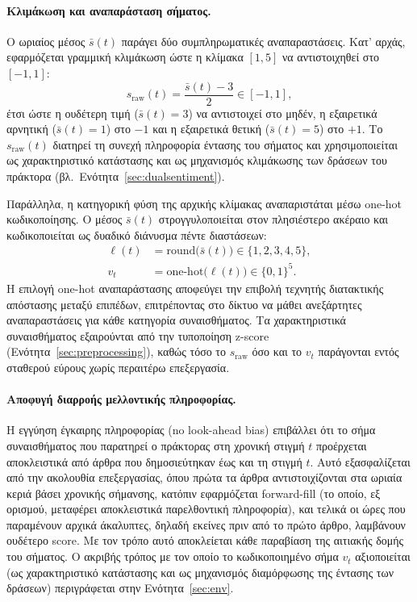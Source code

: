 \paragraph{Κλιμάκωση και αναπαράσταση σήματος.}
Ο ωριαίος μέσος $\bar{s}(t)$ παράγει δύο συμπληρωματικές αναπαραστάσεις.
Κατ' αρχάς, εφαρμόζεται γραμμική κλιμάκωση ώστε η κλίμακα $[1, 5]$ να
αντιστοιχηθεί στο $[-1, 1]$:
\begin{equation}
  s_{\mathrm{raw}}(t) = \frac{\bar{s}(t) - 3}{2} \in [-1, 1],
  \label{eq:sentnorm}
\end{equation}
έτσι ώστε η ουδέτερη τιμή ($\bar{s}(t) = 3$) να αντιστοιχεί στο μηδέν, η
εξαιρετικά αρνητική ($\bar{s}(t) = 1$) στο $-1$ και η εξαιρετικά θετική
($\bar{s}(t) = 5$) στο $+1$. Το $s_{\mathrm{raw}}(t)$ διατηρεί τη συνεχή
πληροφορία έντασης του σήματος και χρησιμοποιείται ως χαρακτηριστικό
κατάστασης και ως μηχανισμός κλιμάκωσης των δράσεων του πράκτορα (βλ.\
Ενότητα~\ref{sec:dualsentiment}).

Παράλληλα, η κατηγορική φύση της αρχικής κλίμακας αναπαριστάται μέσω
one-hot κωδικοποίησης. Ο μέσος $\bar{s}(t)$ στρογγυλοποιείται στον πλησιέστερο
ακέραιο και κωδικοποιείται ως δυαδικό διάνυσμα πέντε διαστάσεων:
\begin{align}
  \ell(t) &= \mathrm{round}\bigl(\bar{s}(t)\bigr) \in \{1, 2, 3, 4, 5\},
  \label{eq:round} \\
  v_t     &= \mathrm{one\text{-}hot}\bigl(\ell(t)\bigr) \in \{0, 1\}^{5}.
  \label{eq:onehot}
\end{align}
Η επιλογή one-hot αναπαράστασης αποφεύγει την επιβολή τεχνητής διατακτικής
απόστασης μεταξύ επιπέδων, επιτρέποντας στο δίκτυο να μάθει ανεξάρτητες
αναπαραστάσεις για κάθε κατηγορία συναισθήματος. Τα χαρακτηριστικά
συναισθήματος εξαιρούνται από την τυποποίηση z-score
(Ενότητα~\ref{sec:preprocessing}), καθώς τόσο το $s_{\mathrm{raw}}$ όσο και
το $v_t$ παράγονται εντός σταθερού εύρους χωρίς περαιτέρω επεξεργασία.

\paragraph{Αποφυγή διαρροής μελλοντικής πληροφορίας.}
Η εγγύηση έγκαιρης πληροφορίας (no look-ahead bias) επιβάλλει ότι το σήμα
συναισθήματος που παρατηρεί ο πράκτορας στη χρονική στιγμή $t$ προέρχεται
αποκλειστικά από άρθρα που δημοσιεύτηκαν έως και τη στιγμή $t$. Αυτό
εξασφαλίζεται από την ακολουθία επεξεργασίας, όπου πρώτα τα άρθρα αντιστοιχίζονται
στα ωριαία κεριά βάσει χρονικής σήμανσης, κατόπιν εφαρμόζεται forward-fill
(το οποίο, εξ ορισμού, μεταφέρει αποκλειστικά παρελθοντική πληροφορία), και
τελικά οι ώρες που παραμένουν αρχικά άκαλυπτες, δηλαδή εκείνες πριν από το
πρώτο άρθρο, λαμβάνουν ουδέτερο score. Με τον τρόπο αυτό
αποκλείεται κάθε παραβίαση της αιτιακής δομής του σήματος. Ο ακριβής τρόπος
με τον οποίο το κωδικοποιημένο σήμα $v_t$ αξιοποιείται (ως χαρακτηριστικό
κατάστασης και ως μηχανισμός διαμόρφωσης της έντασης των δράσεων)
περιγράφεται στην Ενότητα~\ref{sec:env}.


